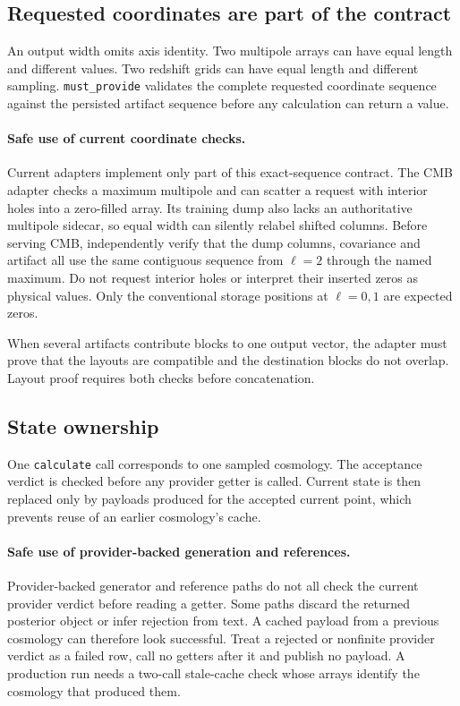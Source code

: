 \documentclass[10pt,aps,prd,twocolumn,nofootinbib]{revtex4-2}
\newcommand{\code}[1]{\texttt{#1}}
\begin{document}
\subsection{Requested coordinates are part of the contract}

An output width omits axis identity.  Two multipole arrays can have equal length
and different values.  Two redshift grids can have equal length and different
sampling.  \code{must\_provide} validates the complete requested coordinate
sequence against the persisted artifact sequence before any calculation can
return a value.

\paragraph{Safe use of current coordinate checks.}
Current adapters implement only part of this exact-sequence contract.  The CMB
adapter checks a maximum multipole and can scatter a request with interior
holes into a zero-filled array.  Its training dump also lacks an authoritative
multipole sidecar, so equal width can silently relabel shifted columns.  Before
serving CMB, independently verify that the dump columns, covariance and
artifact all use the same contiguous sequence from $\ell=2$ through the named
maximum.  Do not request interior holes or interpret their inserted zeros as
physical values.  Only the conventional storage positions at $\ell=0,1$ are
expected zeros.

When several artifacts contribute blocks to one output vector, the adapter
must prove that the layouts are compatible and the destination blocks do not
overlap.  Layout proof requires both checks before concatenation.

\subsection{State ownership}

One \code{calculate} call corresponds to one sampled cosmology.  The
acceptance verdict is checked before any provider getter is called.  Current
state is then replaced only by payloads produced for the accepted current
point, which prevents reuse of an earlier cosmology's cache.

\paragraph{Safe use of provider-backed generation and references.}
Provider-backed generator and reference paths do not all check the current
provider verdict before reading a getter.  Some paths discard the returned
posterior object or infer rejection from text.  A cached payload from a
previous cosmology can therefore look successful.  Treat a rejected or
nonfinite provider verdict as a failed row, call no getters after it and
publish no payload.  A production run needs a two-call stale-cache check whose
arrays identify the cosmology that produced them.
\end{document}

